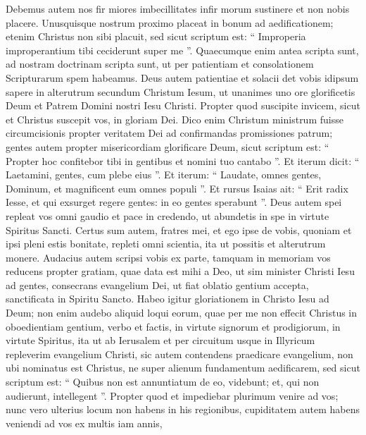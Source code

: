 \begin{biblechapter}
\begin{biblechapter}
\begin{biblechapter}
\begin{biblechapter}
\begin{biblechapter}
\begin{biblechapter}
\begin{biblechapter}
\begin{biblechapter}
\begin{biblechapter}
\begin{biblechapter}
\begin{biblechapter}
\begin{biblechapter}
\begin{biblechapter}
\begin{biblechapter}
\begin{biblechapter}
\verse Debemus autem nos fir miores imbecillitates infir morum sustinere et non nobis placere. 
\verse Unusquisque nostrum proximo placeat in bonum ad aedificationem; 
\verse etenim Christus non sibi placuit, sed sicut scriptum est: “ Improperia improperantium tibi ceciderunt super me ”. 
\verse Quaecumque enim antea scripta sunt, ad nostram doctrinam scripta sunt, ut per patientiam et consolationem Scripturarum spem habeamus. 
\verse Deus autem patientiae et solacii det vobis idipsum sapere in alterutrum secundum Christum Iesum, 
\verse ut unanimes uno ore glorificetis Deum et Patrem Domini nostri Iesu Christi.
 \verse Propter quod suscipite invicem, sicut et Christus suscepit vos, in gloriam Dei. 
\verse Dico enim Christum ministrum fuisse circumcisionis propter veritatem Dei ad confirmandas promissiones patrum; 
\verse gentes autem propter misericordiam glorificare Deum, sicut scriptum est:
 “ Propter hoc confitebor tibi in gentibus et nomini tuo cantabo ”.
 \verse Et iterum dicit: “ Laetamini, gentes, cum plebe eius ”.
 \verse Et iterum:
 “ Laudate, omnes gentes, Dominum,
 et magnificent eum omnes populi ”.
 \verse Et rursus Isaias ait:
 “ Erit radix Iesse,
 et qui exsurget regere gentes:
 in eo gentes sperabunt ”.
 \verse Deus autem spei repleat vos omni gaudio et pace in credendo, ut abundetis in spe in virtute Spiritus Sancti.
 \verse Certus sum autem, fratres mei, et ego ipse de vobis, quoniam et ipsi pleni estis bonitate, repleti omni scientia, ita ut possitis et alterutrum monere. 
 \verse Audacius autem scripsi vobis ex parte, tamquam in memoriam vos reducens propter gratiam, quae data est mihi a Deo, 
\verse ut sim minister Christi Iesu ad gentes, consecrans evangelium Dei, ut fiat oblatio gentium accepta, sanctificata in Spiritu Sancto. 
\verse Habeo igitur gloriationem in Christo Iesu ad Deum; 
\verse non enim audebo aliquid loqui eorum, quae per me non effecit Christus in oboedientiam gentium, verbo et factis, 
\verse in virtute signorum et prodigiorum, in virtute Spiritus, ita ut ab Ierusalem et per circuitum usque in Illyricum repleverim evangelium Christi, 
\verse sic autem contendens praedicare evangelium, non ubi nominatus est Christus, ne super alienum fundamentum aedificarem, 
\verse sed sicut scriptum est:
 “ Quibus non est annuntiatum de eo, videbunt;
 et, qui non audierunt, intellegent ”.
 \verse Propter quod et impediebar plurimum venire ad vos; 
\verse nunc vero ulterius locum non habens in his regionibus, cupiditatem autem habens veniendi ad vos ex multis iam annis, 

\end{biblechapter}
\end{biblechapter}
\end{biblechapter}
\end{biblechapter}
\end{biblechapter}
\end{biblechapter}
\end{biblechapter}
\end{biblechapter}
\end{biblechapter}
\end{biblechapter}
\end{biblechapter}
\end{biblechapter}
\end{biblechapter}
\end{biblechapter}
\end{biblechapter}
